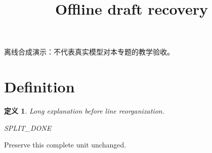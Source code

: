 \documentclass[UTF8,fontset=fandol,11pt]{ctexart}
\title{Offline draft recovery}
\date{}
\newtheorem{definition}{定义}[section]
\begin{document}
\maketitle
\par\noindent 离线合成演示：不代表真实模型对本专题的教学验收。\par
\section{Definition}\label{sec:S01}
\begin{definition}
Long explanation before line reorganization.

SPLIT_DONE
\end{definition}
Preserve this complete unit unchanged.\par
\end{document}
